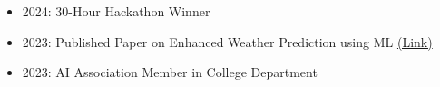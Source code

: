 \documentclass[10pt,a4paper,ragged2e,withhyper]{altacv}
\begin{document}
\begin{paracol}{2}
\divider


\divider


\begin{itemize}
    \item 2024: 30-Hour Hackathon Winner
    \item 2023: Published Paper on Enhanced Weather Prediction using ML \href{https://github.com/silentFellow/weatherPrediction.git}{(Link)}
    \item 2023: AI Association Member in College Department
\end{itemize}


\end{paracol}
\end{document}
